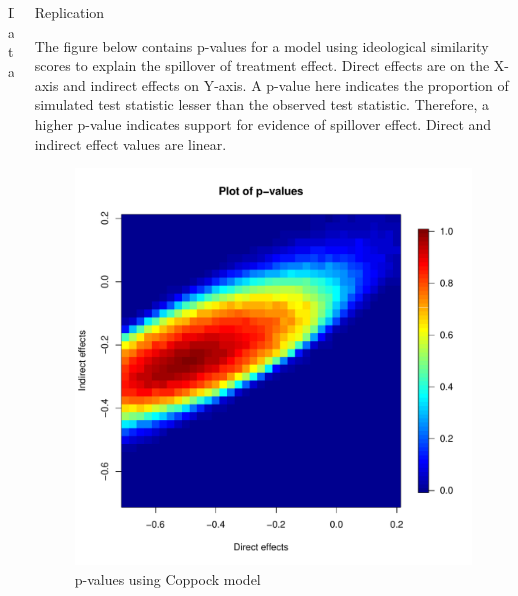 \documentclass[final]{beamer}
\newlength{\onecolwid}
\newlength{\onecolwidd}
\begin{document}
\begin{frame}[t]
\begin{columns}[t]
\begin{column}{\onecolwidd}
\begin{block}{Data}
\begin{rmfamily}
	\end{rmfamily}						
	\end{block}
	
	\end{column}



\begin{column}{\onecolwidd}

	\begin{block}{Replication}
	\begin{rmfamily}
	
	The figure below contains p-values for a model using ideological similarity scores to explain the spillover of treatment effect. Direct effects are on the X-axis and indirect effects on Y-axis. A p-value here indicates the proportion of simulated test statistic lesser than the observed test statistic. Therefore, a higher p-value indicates support for evidence of spillover effect. Direct and indirect effect values are linear.


	\begin{figure}

	\centering
	\includegraphics[scale=1]{pvalues_figure.pdf}
	\caption{p-values using Coppock model}
	\end{figure}

	\end{rmfamily}						
	\end{block}



\end{column}
\end{columns}
\end{frame}
\end{document}

